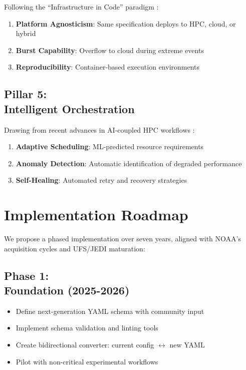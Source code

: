 \documentclass[11pt,twocolumn]{article}
\begin{document}
Following the ``Infrastructure in Code'' paradigm \cite{tankov2021infrastructure_in_code}:

\begin{enumerate}
    \item \textbf{Platform Agnosticism}: Same specification deploys to HPC, cloud, or hybrid
    \item \textbf{Burst Capability}: Overflow to cloud during extreme events
    \item \textbf{Reproducibility}: Container-based execution environments
\end{enumerate}

\subsection{Pillar 5:\\ Intelligent Orchestration}

Drawing from recent advances in AI-coupled HPC workflows \cite{jha2022ai_hpc_workflows}:

\begin{enumerate}
    \item \textbf{Adaptive Scheduling}: ML-predicted resource requirements
    \item \textbf{Anomaly Detection}: Automatic identification of degraded performance
    \item \textbf{Self-Healing}: Automated retry and recovery strategies
\end{enumerate}

\section{Implementation Roadmap}

We propose a phased implementation over seven years, aligned with NOAA's acquisition cycles and UFS/JEDI maturation:

\subsection{Phase 1:\\ Foundation (2025-2026)}
\begin{itemize}
    \item Define next-generation YAML schema with community input
    \item Implement schema validation and linting tools
    \item Create bidirectional converter: current config $\leftrightarrow$ new YAML
    \item Pilot with non-critical experimental workflows
\end{itemize}
\end{document}
